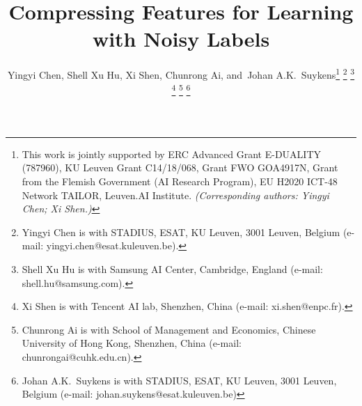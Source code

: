\documentclass[journal]{IEEEtran}
\begin{document}
\title{Compressing Features for Learning \\ with Noisy Labels}

\author{Yingyi Chen,
        Shell Xu Hu,
        Xi Shen,
        Chunrong Ai,
        and~Johan A.K.~Suykens\thanks{This work is jointly supported by ERC Advanced Grant E-DUALITY (787960), KU Leuven Grant C14/18/068, Grant FWO GOA4917N, Grant from the Flemish Government (AI Research Program), EU H2020 ICT-48 Network TAILOR, Leuven.AI Institute.
\textit{(Corresponding authors: Yingyi Chen; Xi Shen.)}}
\thanks{Yingyi Chen is with STADIUS, ESAT, KU Leuven, 3001 Leuven, Belgium
(e-mail: yingyi.chen@esat.kuleuven.be).}
\thanks{Shell Xu Hu is with Samsung AI Center, Cambridge, England 
(e-mail: shell.hu@samsung.com).}
\thanks{Xi Shen is with Tencent AI lab, Shenzhen, China 
(e-mail: xi.shen@enpc.fr).}
\thanks{Chunrong Ai is with School of Management and Economics, Chinese University of Hong Kong, Shenzhen, China 
(e-mail: chunrongai@cuhk.edu.cn).}
\thanks{Johan A.K.~Suykens is with STADIUS, ESAT, KU Leuven, 3001 Leuven, Belgium 
(e-mail: johan.suykens@esat.kuleuven.be)}}


\maketitle
\end{document}
